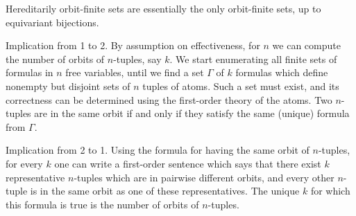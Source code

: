 Hereditarily orbit-finite sets are essentially the only orbit-finite sets, up to equivariant bijections. 

% 
% 
% 
% 



\newcommand{\freevar}{\mathrm{freevar}}






{
Implication from 1 to 2. By assumption on effectiveness, for $n$ we can compute the number of orbits of $n$-tuples, say $k$. We start enumerating all finite sets of formulas in $n$ free variables, until we find a set $\Gamma$ of $k$ formulas which define nonempty but disjoint sets of $n$ tuples of atoms. Such a set must exist, and its correctness can be determined using the first-order theory of the atoms. Two $n$-tuples are in the same orbit if and only if they satisfy the same (unique) formula from $\Gamma$.

Implication from 2 to 1. Using the formula for having the same orbit of $n$-tuples, for every $k$ one can write a first-order sentence which says that there exist $k$ representative $n$-tuples which are in pairwise different orbits, and every other $n$-tuple is in the same orbit as one of these representatives. The unique $k$ for which this formula is true is the number of orbits of $n$-tuples.
}




